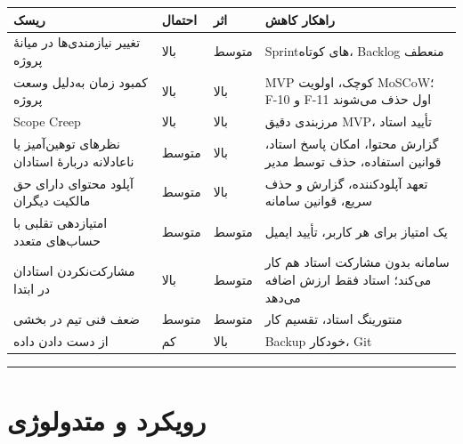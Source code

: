 \documentclass[12pt, a4paper]{article}
\begin{document}
{\def\LTcaptype{none} %
\begin{longtable}[]{@{}
  >{\raggedright\arraybackslash}p{}
  >{\raggedright\arraybackslash}p{}
  >{\raggedright\arraybackslash}p{}
  >{\raggedright\arraybackslash}p{}@{}}
\toprule\noalign{}
\begin{minipage}[b]{\linewidth}\raggedright
ریسک
\end{minipage} & \begin{minipage}[b]{\linewidth}\raggedright
احتمال
\end{minipage} & \begin{minipage}[b]{\linewidth}\raggedright
اثر
\end{minipage} & \begin{minipage}[b]{\linewidth}\raggedright
راهکار کاهش
\end{minipage} \\
\midrule\noalign{}
\endhead
\bottomrule\noalign{}
\endlastfoot
تغییر نیازمندی‌ها در میانهٔ پروژه & بالا & متوسط & Sprintهای کوتاه، Backlog منعطف \\
کمبود زمان به‌دلیل وسعت پروژه & بالا & بالا & MVP کوچک، اولویت MoSCoW؛ F-10 و F-11 اول حذف می‌شوند \\
Scope Creep & بالا & بالا & مرزبندی دقیق MVP، تأیید استاد \\
نظرهای توهین‌آمیز یا ناعادلانه دربارهٔ استادان & متوسط & بالا & گزارش محتوا، امکان پاسخ استاد، قوانین استفاده، حذف توسط مدیر \\
آپلود محتوای دارای حق مالکیت دیگران & متوسط & بالا & تعهد آپلودکننده، گزارش و حذف سریع، قوانین سامانه \\
امتیازدهی تقلبی با حساب‌های متعدد & متوسط & متوسط & یک امتیاز برای هر کاربر، تأیید ایمیل \\
مشارکت‌نکردن استادان در ابتدا & بالا & متوسط & سامانه بدون مشارکت استاد هم کار می‌کند؛ استاد فقط ارزش اضافه می‌دهد \\
ضعف فنی تیم در بخشی & متوسط & متوسط & منتورینگ استاد، تقسیم کار \\
از دست دادن داده & کم & بالا & Backup خودکار، Git \\
\end{longtable}
}

\begin{center}\rule{0.5\linewidth}{0.5pt}\end{center}

\section{رویکرد و متدولوژی}
\end{document}

